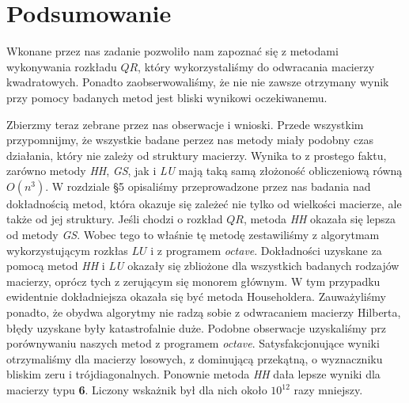 \section{Podsumowanie}
Wkonane przez nas zadanie pozwoliło nam zapoznać się z metodami wykonywania rozkładu
$QR$, który wykorzystaliśmy do odwracania macierzy kwadratowych. Ponadto zaobserwowaliśmy,
że nie nie zawsze otrzymany wynik przy pomocy badanych metod jest bliski wynikowi oczekiwanemu.

Zbierzmy teraz zebrane przez nas obserwacje i wnioski. Przede wszystkim przypomnijmy, że wszystkie
badane perzez nas metody miały podobny czas działania, który nie zależy od struktury macierzy.
Wynika to z prostego faktu, zarówno metody \textit{HH}, \textit{GS}, jak i \textit{LU} mają taką
samą złożoność obliczeniową równą $O(n^3)$. W rozdziale \S5 opisaliśmy przeprowadzone przez nas
badania nad dokładnością metod, która okazuje się zależeć nie tylko od wielkości macierze, ale
także od jej struktury. Jeśli chodzi o rozkład $QR$, metoda \textit{HH} okazała się lepsza od
metody \textit{GS}. Wobec tego to właśnie tę metodę zestawiliśmy z algorytmam wykorzystującym
rozkłas $LU$ i z programem \textit{octave}. Dokładności uzyskane za pomocą metod \textit{HH} i
\textit{LU} okazały się zbliożone dla wszystkich badanych rodzajów macierzy, oprócz tych z zerującym
się monorem głównym. W tym przypadku ewidentnie dokładniejsza okazała się być metoda Householdera.
Zauważyliśmy ponadto, że obydwa algorytmy nie radzą sobie z odwracaniem macierzy Hilberta, błędy
uzyskane były katastrofalnie duże. Podobne obserwacje uzyskaliśmy prz porównywaniu naszych metod z
programem \textit{octave}. Satysfakcjonujące wyniki otrzymaliśmy dla macierzy losowych, z dominującą
przekątną, o wyznaczniku bliskim zeru i trójdiagonalnych. Ponownie metoda \textit{HH} dała lepsze wyniki dla
macierzy typu \textbf{6}. Liczony wskażnik był dla nich około $10^{12}$ razy mniejszy.
